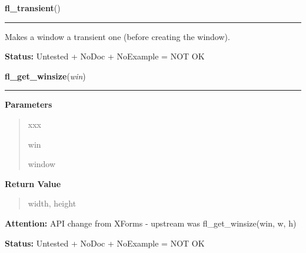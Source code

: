     \label{xformslib:library:fl_transient}

    \vspace{0.5ex}

\hspace{.8\funcindent}\begin{boxedminipage}{\funcwidth}

    \raggedright \textbf{fl\_transient}()

    \vspace{-1.5ex}

    \rule{\textwidth}{0.5\fboxrule}
\setlength{\parskip}{2ex}
    Makes a window a transient one (before creating the window).

\setlength{\parskip}{1ex}
\textbf{Status:} Untested + NoDoc + NoExample = NOT OK



    \end{boxedminipage}

    \label{xformslib:library:fl_get_winsize}

    \vspace{0.5ex}

\hspace{.8\funcindent}\begin{boxedminipage}{\funcwidth}

    \raggedright \textbf{fl\_get\_winsize}(\textit{win})

    \vspace{-1.5ex}

    \rule{\textwidth}{0.5\fboxrule}
\setlength{\parskip}{2ex}
\setlength{\parskip}{1ex}
      \textbf{Parameters}
      \vspace{-1ex}

      \begin{quote}
        \begin{Ventry}{xxx}

          \item[win]

          window

        \end{Ventry}

      \end{quote}

      \textbf{Return Value}
    \vspace{-1ex}

      \begin{quote}
      width, height

      \end{quote}

\textbf{Attention:} API change from XForms - upstream was fl\_get\_winsize(win, w, h)



\textbf{Status:} Untested + NoDoc + NoExample = NOT OK



    \end{boxedminipage}

